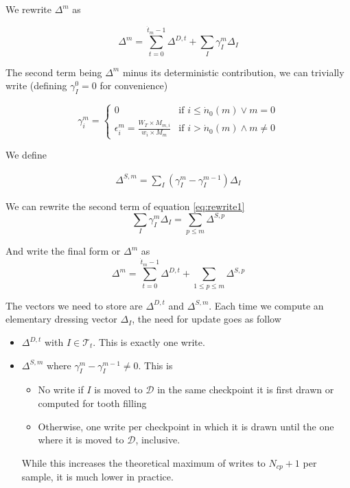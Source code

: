 \documentclass[./thesis.tex]{subfiles}
\begin{document}
We rewrite $\Delta^m$ as

\begin{equation}
\label{eq:rewrite1}
\Delta^{m} = \sum_{t=0}^{\dot t_m - 1} \Delta^{D,t}+ \sum_{I} \gamma^m_{I} \Delta_I
\end{equation}

The second term being $\Delta^m$ minus its deterministic contribution, we can trivially write (defining $\gamma^ 0_I=0$ for convenience)

\begin{equation}
\gamma^m_i = 
\begin{cases}
0 & \text{if } i \leq \dot n_0(m) \vee m=0 \\
\epsilon^m_i = \frac{W_T \times M_{m,i}}{w_i \times M_m} & \text{if } i > \dot n_0(m) \wedge m \neq 0
\end{cases}
\end{equation}

We define

\begin{align}
\Delta^{S,m} = \sum_I (\gamma^m_I - \gamma^{m-1}_I) \Delta_I
\end{align}


We can rewrite the second term of equation \ref{eq:rewrite1}
\begin{equation}
\sum_{I} \gamma^m_{I} \Delta_I = \sum_{p \leq m} \Delta^{S,p}
\end{equation}

And write the final form or $\Delta^m$ as
\begin{equation}
\Delta^m=\sum_{t=0}^{\dot t_{m}-1} \Delta^{D,t} + \sum_{1 \leq p \leq m} \Delta^{S,p}
\end{equation}

The vectors we need to store are $\Delta^{D,t}$ and $\Delta^{S,m}$. Each time we compute an elementary dressing vector $\Delta_I$, the need for update goes as follow

\begin{itemize}
\item
$\Delta^{D,t}$ with $I \in \mathcal{T}_t$. This is exactly one write.
\item
$\Delta^{S,m}$ where $\gamma^m_I - \gamma^{m-1}_I \neq 0$. This is
 \begin{itemize}
 \item
 	No write if $I$ is moved to $\mathcal{D}$ in the same checkpoint it is first drawn or computed for tooth filling
 \item
 	Otherwise, one write per checkpoint in which it is drawn until the one where it is moved to $\mathcal{D}$, inclusive.
 \end{itemize}
 While this increases the theoretical maximum of writes to $N_{cp}+1$ per sample, it is much lower in practice.
\end{itemize}
\end{document}
